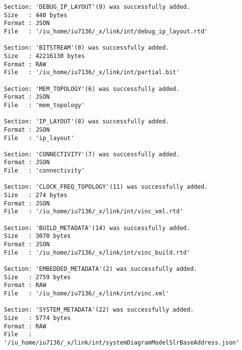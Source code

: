 \begin{lstlisting}[label=lst:code_2,caption=Содержимое файла  v++*.log]
Section: 'DEBUG_IP_LAYOUT'(9) was successfully added.
Size   : 440 bytes
Format : JSON
File   : '/iu_home/iu7136/_x/link/int/debug_ip_layout.rtd'

Section: 'BITSTREAM'(0) was successfully added.
Size   : 42216130 bytes
Format : RAW
File   : '/iu_home/iu7136/_x/link/int/partial.bit'

Section: 'MEM_TOPOLOGY'(6) was successfully added.
Format : JSON
File   : 'mem_topology'

Section: 'IP_LAYOUT'(8) was successfully added.
Format : JSON
File   : 'ip_layout'

Section: 'CONNECTIVITY'(7) was successfully added.
Format : JSON
File   : 'connectivity'

Section: 'CLOCK_FREQ_TOPOLOGY'(11) was successfully added.
Size   : 274 bytes
Format : JSON
File   : '/iu_home/iu7136/_x/link/int/vinc_xml.rtd'

Section: 'BUILD_METADATA'(14) was successfully added.
Size   : 3070 bytes
Format : JSON
File   : '/iu_home/iu7136/_x/link/int/vinc_build.rtd'

Section: 'EMBEDDED_METADATA'(2) was successfully added.
Size   : 2759 bytes
Format : RAW
File   : '/iu_home/iu7136/_x/link/int/vinc.xml'

Section: 'SYSTEM_METADATA'(22) was successfully added.
Size   : 5774 bytes
Format : RAW
File   : '/iu_home/iu7136/_x/link/int/systemDiagramModelSlrBaseAddress.json'


\end{lstlisting}
